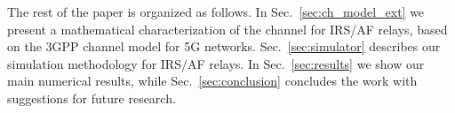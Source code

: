 The rest of the paper is organized as follows. 
In Sec.~\ref{sec:ch_model_ext} we present a mathematical characterization of the channel for IRS/AF relays, based on the 3GPP channel model for 5G networks.
Sec.~\ref{sec:simulator} describes our simulation methodology for IRS/AF relays. %
In Sec.~\ref{sec:results} we show our main numerical results, while Sec.~\ref{sec:conclusion} concludes the work with suggestions for future research.













